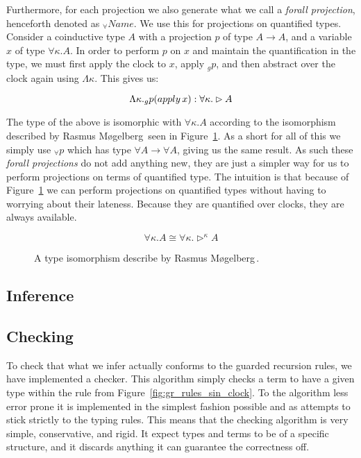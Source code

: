 Furthermore, for each projection we also generate what we call a \emph{forall
  projection}, henceforth denoted as $_\forall Name$. We use this for
projections on quantified types. Consider a coinductive type $A$ with a
projection $p$ of type $A \rightarrow A$, and a variable $x$ of type $\forall
\kappa.A$. In order to perform $p$ on $x$ and maintain the quantification in the
type, we must first apply the clock to $x$, apply $_gp$, and then abstract over the
clock again using $\Lambda \kappa$. This gives us:

\[
\Lambda \kappa . _gp (apply\,x) : \forall \kappa . \rhd A
\]

The type of the above is isomorphic with $\forall \kappa . A$ according to the
isomorphism described by Rasmus M\o gelberg\,\cite{Mogelberg:2014} seen in
Figure~\ref{fig:quantified_later_iso}. As a short for all of this we simply use
$_\forall p$ which has type $\forall A \rightarrow \forall A$, giving us the
same result. As such these \emph{forall projections} do not add anything new,
they are just a simpler way for us to perform projections on terms of quantified
type. The intuition is that because of Figure~\ref{fig:quantified_later_iso} we
can perform projections on quantified types without having to worrying about
their lateness. Because they are quantified over clocks, they are always available.

\begin{figure}[h]
\[
\forall \kappa .A\cong \forall \kappa .\rhd ^\kappa A
\]
  \caption{A type isomorphism describe by Rasmus M\o gelberg\,\cite{Mogelberg:2014}.}
  \label{fig:quantified_later_iso}
\end{figure}

\subsection{Inference}
\subsection{Checking}
To check that what we infer actually conforms to the guarded recursion rules, we
have implemented a checker. This algorithm simply checks a term to have a given
type within the rule from Figure~\ref{fig:gr_rules_sin_clock}. To the algorithm
less error prone it is implemented in the simplest fashion possible and as
attempts to stick strictly to the typing rules. This means that the checking
algorithm is very simple, conservative, and rigid. It expect types and terms to
be of a specific structure, and it discards anything it can guarantee the
correctness off. 

